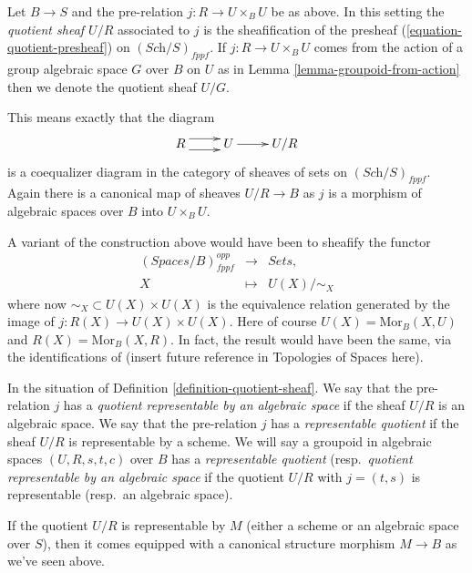 \begin{definition}
\label{definition-quotient-sheaf}
Let $B \to S$ and the pre-relation $j : R \to U \times_B U$ be as above.
In this setting the {\it quotient sheaf $U/R$} associated
to $j$ is the sheafification of the presheaf
(\ref{equation-quotient-presheaf}) on $(\textit{Sch}/S)_{fppf}$.
If $j : R \to U \times_B U$ comes from the action of a
group algebraic space $G$ over $B$ on $U$ as in
Lemma \ref{lemma-groupoid-from-action}
then we denote the quotient sheaf $U/G$.
\end{definition}

\noindent
This means exactly that the diagram
$$
\xymatrix{
R \ar@<1ex>[r] \ar@<-1ex>[r] &
U \ar[r] &
U/R
}
$$
is a coequalizer diagram in the category of sheaves of sets
on $(\textit{Sch}/S)_{fppf}$. Again there is a canonical map
of sheaves $U/R \to B$ as $j$ is a morphism of algebraic spaces over
$B$ into $U \times_B U$.

\begin{remark}
\label{remark-quotient-variant}
A variant of the construction above would have been to sheafify
the functor
$$
\begin{matrix}
(\textit{Spaces}/B)^{opp}_{fppf} &
\longrightarrow &
\textit{Sets}, \\
X &
\longmapsto  &
U(X)/\sim_X
\end{matrix}
$$
where now $\sim_X \subset U(X) \times U(X)$ is the equivalence relation
generated by the image of $j : R(X) \to U(X) \times U(X)$.
Here of course $U(X) = \text{Mor}_B(X, U)$ and $R(X) = \text{Mor}_B(X, R)$.
In fact, the result would have been the same, via the identifications
of (insert future reference in Topologies of Spaces here).
\end{remark}

\begin{definition}
\label{definition-representable-quotient}
In the situation of Definition \ref{definition-quotient-sheaf}.
We say that the pre-relation $j$ has a
{\it quotient representable by an algebraic space}
if the sheaf $U/R$ is an algebraic space.
We say that the pre-relation $j$ has a
{\it representable quotient}
if the sheaf $U/R$ is representable by a scheme.
We will say a groupoid in algebraic spaces $(U, R, s, t, c)$ over $B$ has a
{\it representable quotient}
(resp.\ {\it quotient representable by an algebraic space}
if the quotient $U/R$ with $j = (t, s)$ is representable (resp.\ an
algebraic space).
\end{definition}

\noindent
If the quotient $U/R$ is representable by $M$ (either a scheme or an algebraic
space over $S$), then it comes equipped with a canonical structure morphism
$M \to B$ as we've seen above.

